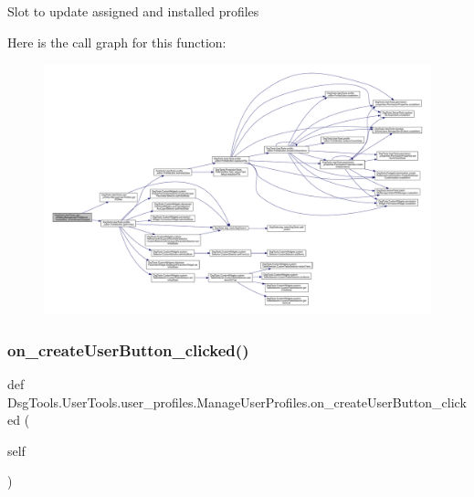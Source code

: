 \begin{DoxyVerb}Slot to update assigned and installed profiles
\end{DoxyVerb}
 Here is the call graph for this function\+:
\nopagebreak
\begin{figure}[H]
\begin{center}
\leavevmode
\includegraphics[width=350pt]{class_dsg_tools_1_1_user_tools_1_1user__profiles_1_1_manage_user_profiles_a76c15098051c2641417b7e49ca93f1bb_cgraph}
\end{center}
\end{figure}
\mbox{\label{class_dsg_tools_1_1_user_tools_1_1user__profiles_1_1_manage_user_profiles_aa73f5b9db86127096b292eaf71e5b60a}} 
\subsubsection{\texorpdfstring{on\+\_\+create\+User\+Button\+\_\+clicked()}{on\_createUserButton\_clicked()}}
{\footnotesize\ttfamily def Dsg\+Tools.\+User\+Tools.\+user\+\_\+profiles.\+Manage\+User\+Profiles.\+on\+\_\+create\+User\+Button\+\_\+clicked (\begin{DoxyParamCaption}\item[{}]{self }\end{DoxyParamCaption})}

